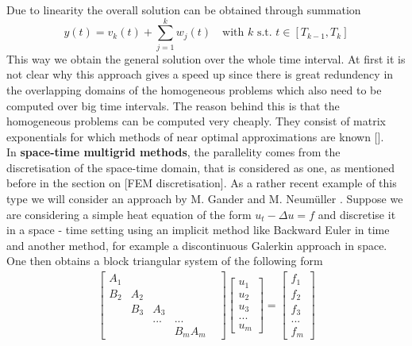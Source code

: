 \documentclass[fleqn, a4paper, 11pt, bibliography=totoc]{report}
\begin{document}
Due to linearity the overall solution can be obtained through summation
\begin{equation}
y(t) = v_k(t) + \sum_{j=1}^{k}w_j(t) \quad \text{with } k \text{ s.t. } t \in [T_{k-1}, T_k]
\end{equation}
This way we obtain the general solution over the whole time interval. At first it is not clear why this approach gives a speed up since there is great redundency in the overlapping domains of the homogeneous problems which also need to be computed over big time intervals. The reason behind this is that the homogeneous problems can be computed very cheaply. They consist of matrix exponentials for which methods of near optimal approximations are known [\cite{}]. 
\smallskip
\\
In \textbf{space-time multigrid methods}, the parallelity comes from the discretisation of the space-time domain, that is considered as one, as mentioned before in the section on [FEM discretisation]. As a rather recent example of this type we will consider an approach by M. Gander and M. Neum\"uller \cite{gander2016analysis}. Suppose we are considering a simple heat equation of the form $u_t - \Delta u = f $ and discretise it in a space - time setting using an implicit method like Backward Euler in time and another method, for example a discontinuous Galerkin approach in space. One then obtains a block triangular system of the following form
\begin{equation}
\begin{aligned}
\begin{bmatrix}
A_1 & & & & \\
B_2 & A_2 & & & \\
& B_3 & A_3 & & \\
& & ... & ... & \\
& & & B_m A_m 
\end{bmatrix}
\begin{bmatrix}
u_1 \\
u_2 \\
u_3 \\
... \\
u_m 
\end{bmatrix}
= \begin{bmatrix}
f_1 \\
f_2 \\
f_3 \\
... \\
f_m 
\end{bmatrix}
\end{aligned}
\end{equation}
\end{document}
